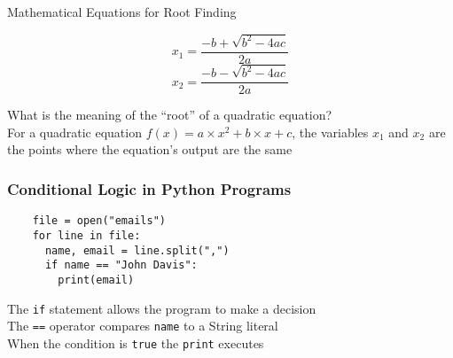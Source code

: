 \documentclass[14pt,aspectratio=169]{beamer}
\begin{document}
%
\begin{frame}{Mathematical Equations for Root Finding}
  \vspace*{-.5in}
  \begin{center}
    \fontsize{20}{30}\selectfont
    \begin{equation*}
      x_1=\frac{-b+\sqrt{b^2-4ac}}{2a}
    \end{equation*}
    \begin{equation*}
      x_2=\frac{-b-\sqrt{b^2-4ac}}{2a}
    \end{equation*}
  \end{center}
  \vspace{.05ex}
  \begin{center}
    \small What is the meaning of the ``root'' of a quadratic equation? \\
    \small For a quadratic equation $f(x)= a \times x^2 + b \times x +c$, the
    variables $x_1$ and $x_2$ are the points where the equation's output are
    the same\\
  \end{center}
\end{frame}

%
\begin{frame}[fragile]
  \frametitle{Conditional Logic in Python Programs}
  \normalsize
  \hspace*{-.65in}
  \begin{minipage}{6in}
    \vspace*{.25in}
    \begin{verbatim}
    file = open("emails")
    for line in file:
      name, email = line.split(",")
      if name == "John Davis":
        print(email)
    \end{verbatim}
  \end{minipage}
  \vspace*{.25in}
  \begin{center}
    \normalsize \noindent The {\tt if} statement allows the program to make a decision \\
    \normalsize \noindent The {\tt ==} operator compares {\tt name} to a String literal \\
    \normalsize \noindent When the condition is {\tt true} the {\tt print} executes \\
  \end{center}
\end{frame}
\end{document}
